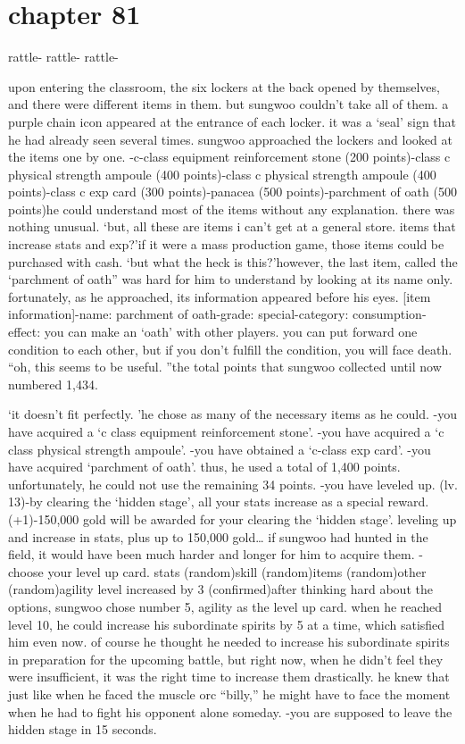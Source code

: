 \section{chapter 81}

                            rattle- rattle- rattle-




upon entering the classroom, the six lockers at the back opened by themselves, and there were different items in them.
but sungwoo couldn’t take all of them.
 a purple chain icon appeared at the entrance of each locker.
 it was a ‘seal’ sign that he had already seen several times.
sungwoo approached the lockers and looked at the items one by one.
-c-class equipment reinforcement stone (200 points)-class c physical strength ampoule (400 points)-class c physical strength ampoule (400 points)-class c exp card (300 points)-panacea (500 points)-parchment of oath (500 points)he could understand most of the items without any explanation.
 there was nothing unusual.
‘but, all these are items i can’t get at a general store.
 items that increase stats and exp?’if it were a mass production game, those items could be purchased with cash.
‘but what the heck is this?’however, the last item, called the ‘parchment of oath” was hard for him to understand by looking at its name only.
 fortunately, as he approached, its information appeared before his eyes.
[item information]-name: parchment of oath-grade: special-category: consumption-effect: you can make an ‘oath’ with other players.
 you can put forward one condition to each other, but if you don’t fulfill the condition, you will face death.
“oh, this seems to be useful.
”the total points that sungwoo collected until now numbered 1,434.

‘it doesn’t fit perfectly.
’he chose as many of the necessary items as he could.
-you have acquired a ‘c class equipment reinforcement stone’.
-you have acquired a ‘c class physical strength ampoule’.
-you have obtained a ‘c-class exp card’.
-you have acquired ‘parchment of oath’.
thus, he used a total of 1,400 points.
 unfortunately, he could not use the remaining 34 points.
-you have leveled up.
 (lv.
 13)-by clearing the ‘hidden stage’, all your stats increase as a special reward.
 (+1)-150,000 gold will be awarded for your clearing the ‘hidden stage’.
leveling up and increase in stats, plus up to 150,000 gold… if sungwoo had hunted in the field, it would have been much harder and longer for him to acquire them.
-choose your level up card.
stats (random)skill (random)items (random)other (random)agility level increased by 3 (confirmed)after thinking hard about the options, sungwoo chose number 5, agility as the level up card.
when he reached level 10, he could increase his subordinate spirits by 5 at a time, which satisfied him even now.
of course he thought he needed to increase his subordinate spirits in preparation for the upcoming battle, but right now, when he didn’t feel they were insufficient, it was the right time to increase them drastically.
 he knew that just like when he faced the muscle orc “billy,” he might have to face the moment when he had to fight his opponent alone someday.
-you are supposed to leave the hidden stage in 15 seconds.

